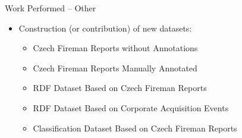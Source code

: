 \documentclass[xcolor=dvipsnames]{beamer}
\begin{document}
\begin{frame}{Work Performed -- Other}
\begin{itemize}
	\item Construction (or contribution) of new datasets:	
	\begin{itemize}
		\item Czech Fireman Reports without Annotations
		\item Czech Fireman Reports Manually Annotated
		\item RDF Dataset Based on Czech Fireman Reports
		\item RDF Dataset Based on Corporate Acquisition Events
		\item Classification Dataset Based on Czech Fireman Reports	
	\end{itemize}	
\end{itemize}	
	

\end{frame}
\end{document}

